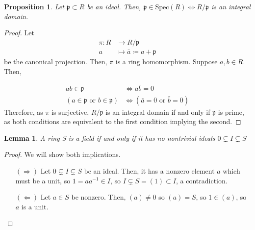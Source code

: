 \documentclass[11pt]{article}
\newtheorem{lemma}[theorem]{Lemma}
\newtheorem{prop}[theorem]{Proposition}
\theoremstyle{definition}
\begin{document}
        \begin{prop}
            Let $\mathfrak{p} \subset R$ be an ideal.
            Then, $\mathfrak{p} \in \text{Spec}(R) \Leftrightarrow R/\mathfrak{p}$ is an integral domain.
        \end{prop}
            \begin{proof}
                Let \begin{align}
                    \pi: R &\rightarrow R/\mathfrak{p} \nonumber \\
                        a &\mapsto \bar{a} \coloneqq a + \mathfrak{p} \nonumber
                \end{align}
                be the canonical projection.
                Then, $\pi$ is a ring homomorphism.
                Suppose $a, b \in R$.
                Then,

                \begin{align}
                    ab \in \mathfrak{p} &\Leftrightarrow \bar{a}\bar{b} = 0 \nonumber \\
                    (a \in \mathfrak{p} \text{ or } b \in \mathfrak{p}) &\Leftrightarrow (\bar{a} = 0 \text{ or } \bar{b} = 0) \nonumber
                \end{align}
                Therefore, as $\pi$ is surjective, $R/\mathfrak{p}$ is an integral domain if and only if $\mathfrak{p}$ is prime,
                as both conditions are equivalent to the first condition implying the second.
            \end{proof}

        \begin{lemma}
                     A ring S is a field if and only if it has no nontrivial ideals $ 0 \subsetneq I \subsetneq S$
        \end{lemma}
                \begin{proof}
                    We will show both implications.

                    \begin{itemize}
                        \item [$(\Rightarrow)$] Let $ 0 \subsetneq I \subsetneq S$ be an ideal.
                        Then, it has a nonzero element $a$ which must be a unit, so
                        $1 = a a^{-1} \in I$, so $I \subsetneq S = (1) \subset I$, a contradiction.

                        \item[$(\Leftarrow)$] Let $a \in S$ be nonzero.
                        Then, $(a) \neq 0$ so $(a) = S$, so $1 \in (a)$, so $a$ is a unit.
                    \end{itemize}

                \end{proof}
    
\end{document}
